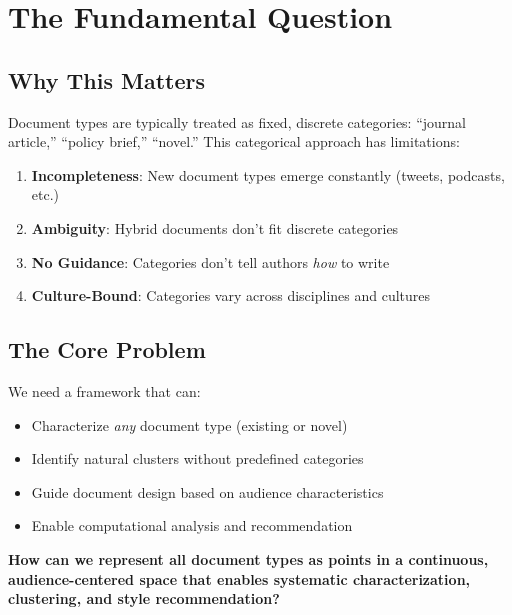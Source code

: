 \section{The Fundamental Question}
\label{sec:doctype-fundamental}

\subsection{Why This Matters}

Document types are typically treated as fixed, discrete categories: ``journal article,''
``policy brief,'' ``novel.'' This categorical approach has limitations:

\begin{enumerate}
\item \textbf{Incompleteness}: New document types emerge constantly (tweets, podcasts, etc.)
\item \textbf{Ambiguity}: Hybrid documents don't fit discrete categories
\item \textbf{No Guidance}: Categories don't tell authors \textit{how} to write
\item \textbf{Culture-Bound}: Categories vary across disciplines and cultures
\end{enumerate}

\subsection{The Core Problem}

We need a framework that can:
\begin{itemize}[nosep]
\item Characterize \textit{any} document type (existing or novel)
\item Identify natural clusters without predefined categories
\item Guide document design based on audience characteristics
\item Enable computational analysis and recommendation
\end{itemize}

\begin{tcolorbox}[colback=red!5!white, colframe=red!75!black,
    title=The Fundamental Question]
\textbf{How can we represent all document types as points in a continuous,
audience-centered space that enables systematic characterization, clustering,
and style recommendation?}
\end{tcolorbox}


